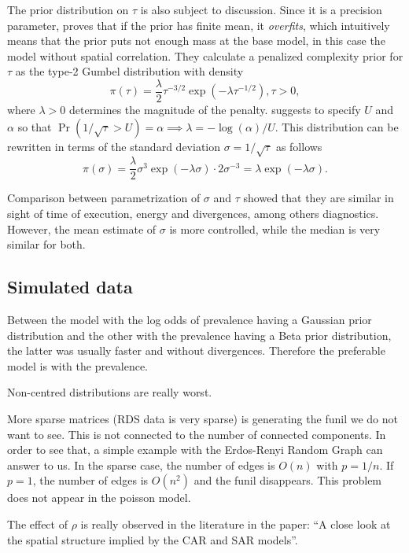 The prior distribution on $\tau$ is also subject to discussion. Since it is a
precision parameter, \textcite[p. 9, Theorem 1]{simpson2017penalising} proves
that if the prior has finite mean, it {\em overfits}, which intuitively means
that the prior puts not enough mass at the base model, in this case the model
without spatial correlation. They calculate a penalized complexity prior for
$\tau$ as the type-2 Gumbel distribution with density 
\begin{equation}
  \label{eq:gumbel-distribution}
  \pi(\tau) = \frac{\lambda}{2}\tau^{-3/2}\exp(-\lambda \tau^{-1/2}), \tau > 0, 
\end{equation}
where $\lambda > 0$ determines the magnitude of the penalty.
\textcite[p. 9]{simpson2017penalising} suggests to specify $U$ and
$\alpha$ so that $\Pr(1 / \sqrt{\tau} > U) = \alpha \implies \lambda =
-\log(\alpha)/U$. This distribution can be rewritten in terms of the standard
deviation $\sigma = 1/ \sqrt{\tau}$ as follows
\begin{equation}
  \label{eq:standard-deviation-gumbel}
  \pi(\sigma) = \frac{\lambda}{2}\sigma^{3}\exp(-\lambda \sigma) \cdot 2\sigma^{-3} = \lambda \exp(-\lambda \sigma). 
\end{equation}

Comparison between parametrization of $\sigma$ and $\tau$ showed that they are
similar in sight of time of execution, energy and divergences, among others
diagnostics. However, the mean estimate of $\sigma$ is more controlled, while 
the median is very similar for both.  

\subsection{Simulated data}

\begin{alineas}
  \item Between the model with the log odds of prevalence having a Gaussian prior
  distribution and the other with the prevalence having a Beta prior
  distribution, 
  the latter was usually faster and without divergences. Therefore the 
  preferable model is with the prevalence. 
  \item Non-centred distributions are really worst. 
  \item More sparse matrices (RDS data is very sparse) is generating the funil
  we do not want to see. This is not connected to the number of connected
  components. In order to see that, a simple example with the Erdos-Renyi
  Random Graph can answer to us. In the sparse case, the number of edges is
  $O(n)$ with $p=1/n$. If $p=1$, the number of edges is $O(n^2)$ and the funil
  disappears. This problem does not appear in the poisson model. 
  \item The effect of $\rho$ is really observed in the literature in the
  paper: ``A close look at the spatial structure implied by the CAR and SAR
  models''. 
\end{alineas}

